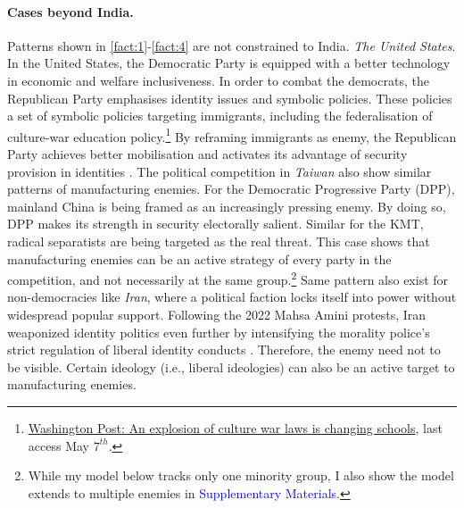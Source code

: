 \documentclass[11pt,twoside]{extarticle}
\newcommand{\suppmat}{\textcolor{blue}{Supplementary Materials}}
\begin{document}
\paragraph{Cases beyond India.}
Patterns shown in \autoref{fact:1}-\autoref{fact:4} are not constrained to India.  
\emph{The United States}. In the United States, the Democratic Party is equipped with a better technology in economic and welfare inclusiveness. In order to combat the democrats, the Republican Party emphasises identity issues and symbolic policies. These policies a set of symbolic policies targeting immigrants, including the federalisation of culture-war education policy.\footnote{\href{https://www.washingtonpost.com/education/2022/10/18/education-laws-culture-war/}{Washington Post: An explosion of culture war laws is changing schools}, last access May $7^{th}$.} By reframing immigrants as enemy, the Republican Party achieves better mobilisation and activates its advantage of security provision in identities \citep*{handan-naderPolarizationStateLegislative2025}. 
The political competition in \emph{Taiwan} also show similar patterns of manufacturing enemies. For the Democratic Progressive Party (DPP), mainland China is being framed as an increasingly pressing enemy. By doing so, DPP makes its strength in security electorally salient. Similar for the KMT, radical separatists are being targeted as the real threat. This case shows that manufacturing enemies can be an active strategy of every party in the competition, and not necessarily at the same group.\footnote{While my model below tracks only one minority group, I also show the model extends to multiple enemies in \suppmat.} Same pattern also exist for non-democracies like \emph{Iran}, where a political faction locks itself into power without widespread popular support. Following the 2022 Mahsa Amini protests, Iran weaponized identity politics even further by intensifying the morality police's strict regulation of liberal identity conducts \citep*{keshavarzianBazaarStateIran2007,kurzmanUnthinkableRevolutionIran2004}. Therefore, the enemy need not to be visible. Certain ideology (i.e., liberal ideologies) can also be an active target to manufacturing enemies.
\end{document}

